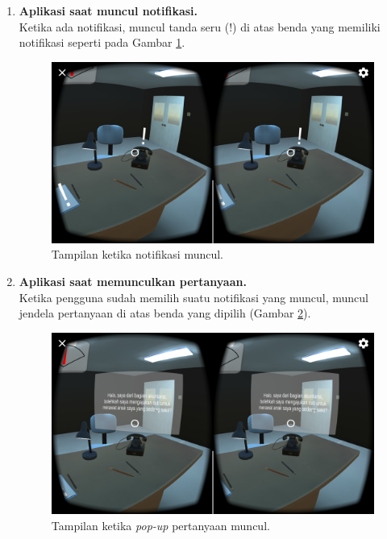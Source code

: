 \begin{enumerate}
    \item \textbf{Aplikasi saat muncul notifikasi.}\\
    Ketika ada notifikasi, muncul tanda seru (!) di atas benda yang memiliki notifikasi seperti pada Gambar \ref{fig:ss_notifikasi}.
    
    \begin{figure}[htbp]
    \centering
    \includegraphics[scale=0.23]{Gambar/screenshot-aplikasi/muncul-notifikasi.png}
    \caption{Tampilan ketika notifikasi muncul.} 
    \label{fig:ss_notifikasi}
    \end{figure}
    
    \item \textbf{Aplikasi saat memunculkan pertanyaan.}\\
    Ketika pengguna sudah memilih suatu notifikasi yang muncul, muncul jendela pertanyaan di atas benda yang dipilih (Gambar \ref{fig:ss_pop_up}). 
    
    \begin{figure}[htbp]
    \centering
    \includegraphics[scale=0.23]{Gambar/screenshot-aplikasi/pop-up.png}
    \caption{Tampilan ketika \textit{pop-up} pertanyaan muncul.} 
    \label{fig:ss_pop_up}
    \end{figure}
    

\end{enumerate}
